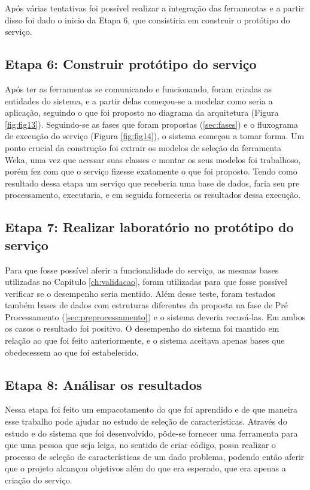 Após várias tentativas foi possível realizar a integração das ferramentas e a partir disso foi dado o inicio da Etapa 6, que consistiria em construir o protótipo do serviço.

\subsection{Etapa 6: Construir protótipo do serviço}

Após ter as ferramentas se comunicando e funcionando, foram criadas as entidades do sistema, e a partir delas começou-se a modelar como seria a aplicação, seguindo o que foi proposto no diagrama da arquitetura (Figura \ref{fig:fig13}). Seguindo-se as fases que foram propostas (\ref{sec:fases}) e o fluxograma de execução do serviço (Figura \ref{fig:fig14}), o sistema começou a tomar forma. Um ponto crucial da construção foi extrair os modelos de seleção da ferramenta Weka, uma vez que acessar suas classes e montar os seus modelos foi trabalhoso, porém fez com que o serviço fizesse exatamente o que foi proposto. Tendo como resultado dessa etapa um serviço que receberia uma base de dados, faria seu pre processamento, executaria, e em seguida forneceria os resultados dessa execução.


\subsection{Etapa 7: Realizar laboratório no protótipo do serviço}

Para que fosse possível aferir a funcionalidade do serviço, as mesmas bases utilizadas no Capítulo \ref{ch:validacao}, foram utilizadas para que fosse possível verificar se o desempenho seria mentido. Além desse teste, foram testados também bases de dados com estruturas diferentes da proposta na fase de Pré Processamento (\ref{sec:preprocessamento}) e o sistema deveria recusá-las. Em ambos os casos o resultado foi positivo. O desempenho do sistema foi mantido em relação ao que foi feito anteriormente, e o sistema aceitava apenas bases que obedecessem ao que foi estabelecido.

\subsection{Etapa 8: Análisar os resultados}

Nessa etapa foi feito um empacotamento do que foi aprendido e de que maneira esse trabalho pode ajudar no estudo de seleção de características. Através do estudo e do sistema que foi desenvolvido, pôde-se fornecer uma ferramenta para que uma pessoa que seja leiga, no sentido de criar código, possa realizar o processo de seleção de características de um dado problema, podendo então aferir que o projeto alcançou objetivos além do que era esperado, que era apenas a criação do serviço.